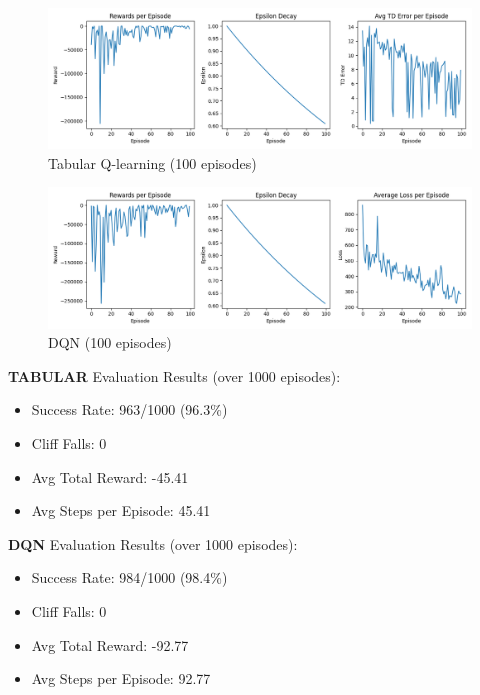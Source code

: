 \documentclass[a4paper,12pt]{article}
\begin{document}
\begin{figure}[H]
    \centering
    \includegraphics[width=\linewidth]{plot_tabular_100ep.png}
    \caption{Tabular Q-learning (100 episodes)}
\end{figure}
\begin{figure}[H]
    \centering
    \includegraphics[width=\linewidth]{plot_dqn_100ep.png}
    \caption{DQN (100 episodes)}
\end{figure}
\noindent \textbf{TABULAR} Evaluation Results (over 1000 episodes):
\begin{itemize}
    \item Success Rate: 963/1000 (96.3\%)
    \item Cliff Falls: 0
    \item Avg Total Reward: -45.41
    \item Avg Steps per Episode: 45.41
\end{itemize}
\textbf{DQN} Evaluation Results (over 1000 episodes):
\begin{itemize}
    \item Success Rate: 984/1000 (98.4\%)
    \item Cliff Falls: 0
    \item Avg Total Reward: -92.77
    \item Avg Steps per Episode: 92.77
\end{itemize}
\end{document}
